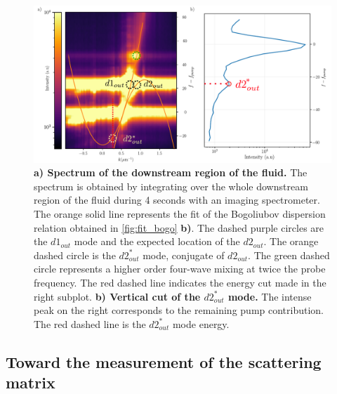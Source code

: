 \begin{figure}
    \centering
    \includegraphics[width=1\textwidth]{chap_stimulated_hawking/fig/disp_supersonic_spectro.pdf}
    \caption{\textbf{a) Spectrum of the downstream region of the fluid.} The spectrum is obtained by integrating over the whole downstream region of the fluid during 4 seconds
    with an imaging spectrometer. The orange solid line represents the fit of the Bogoliubov dispersion relation obtained in \autoref{fig:fit_bogo} \textbf{b)}. The dashed purple circles are 
    the $d1_{out}$ mode and the expected location of the $d2_{out}$.
    The orange dashed circle is the $d2_{out}^*$ mode, conjugate of $d2_{out}$. The green dashed circle represents a higher order four-wave mixing at twice the probe frequency. The red dashed line indicates the energy cut made in the right subplot.
    \textbf{b) Vertical cut of the $d2_{out}^*$ mode.} The intense peak on the right corresponds to the remaining pump contribution. The red dashed line is the $d2_{out}^*$ mode energy.}
    \label{fig:spectrum_spectro}
\end{figure}
\bigskip

\subsection{Toward the measurement of the scattering matrix}
\label{sec:scattering_matrix_measurement}
